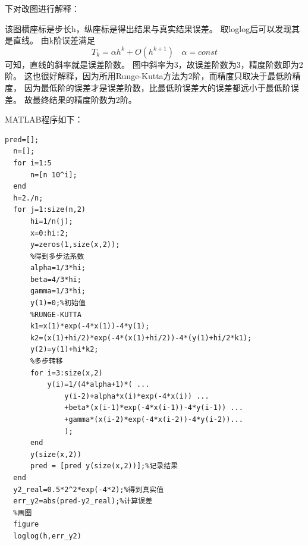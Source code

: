 \documentclass[12pt,a4paper,utf8]{ctexart}
\begin{document}
\begin{enumerate}
下对改图进行解释：

该图横座标是步长h，纵座标是得出结果与真实结果误差。
取loglog后可以发现其是直线。
由k阶误差满足
$$
T_{k}=\alpha h^k+O(h^{k+1})\ \ \ \  \alpha =const
$$
可知，直线的斜率就是误差阶数。
图中斜率为3，故误差阶数为3，精度阶数即为2阶。
这也很好解释，因为所用Runge-Kutta方法为2阶，而精度只取决于最低阶精度，
因为最低阶的误差才是误差阶数，比最低阶误差大的误差都远小于最低阶误差。
故最终结果的精度阶数为2阶。

MATLAB程序如下：
\begin{lstlisting}[frame=single]
  pred=[];
  n=[];
  for i=1:5
      n=[n 10^i];
  end
  h=2./n;
  for j=1:size(n,2)
      hi=1/n(j);
      x=0:hi:2;
      y=zeros(1,size(x,2));
      %得到多步法系数
      alpha=1/3*hi;
      beta=4/3*hi;
      gamma=1/3*hi;
      y(1)=0;%初始值
      %RUNGE-KUTTA
      k1=x(1)*exp(-4*x(1))-4*y(1);
      k2=(x(1)+hi/2)*exp(-4*(x(1)+hi/2))-4*(y(1)+hi/2*k1);
      y(2)=y(1)+hi*k2;
      %多步转移
      for i=3:size(x,2)
          y(i)=1/(4*alpha+1)*( ...
              y(i-2)+alpha*x(i)*exp(-4*x(i)) ...
              +beta*(x(i-1)*exp(-4*x(i-1))-4*y(i-1)) ...
              +gamma*(x(i-2)*exp(-4*x(i-2))-4*y(i-2))...
              );
      end
      y(size(x,2))
      pred = [pred y(size(x,2))];%记录结果
  end
  y2_real=0.5*2^2*exp(-4*2);%得到真实值
  err_y2=abs(pred-y2_real);%计算误差
  %画图
  figure
  loglog(h,err_y2)
\end{lstlisting}


\end{enumerate}
\end{document}
